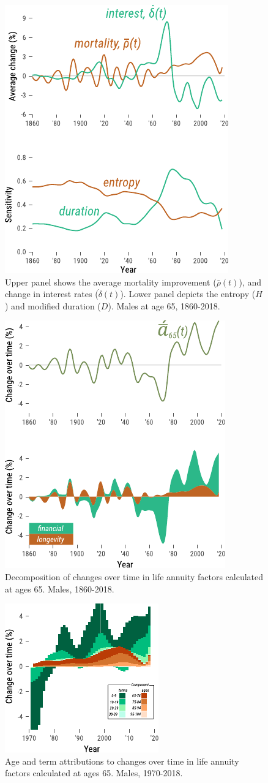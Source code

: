 \documentclass[12pt]{article}
\begin{document}
\begin{figure}[!ht]
	\centering
	\includegraphics[width=0.5\linewidth]{Fig/IntMort}
	\caption{{Upper panel shows the average mortality improvement ($\bar{\rho}(t)$), and change in interest rates ($\dot{\delta}(t)$). Lower panel depicts the entropy ($H$) and modified duration ($D$). Males at age 65, 1860-2018.}}
	\label{fig:Fig3}
\end{figure}


\begin{figure}[!ht]
	\centering
	\includegraphics[width=0.5\linewidth]{Fig/DescSingle}
	\caption{{Decomposition of changes over time in life annuity factors calculated at ages 65. Males, 1860-2018.}}
	\label{fig:Fig4}
\end{figure}



\begin{figure}[!ht]
	\centering
	\includegraphics[width=0.4\linewidth]{Fig/DescAge}
	\caption{{Age and term attributions to changes over time in life annuity factors calculated at ages 65. Males, 1970-2018.}}
	\label{fig:Fig5}
\end{figure}
\end{document}

